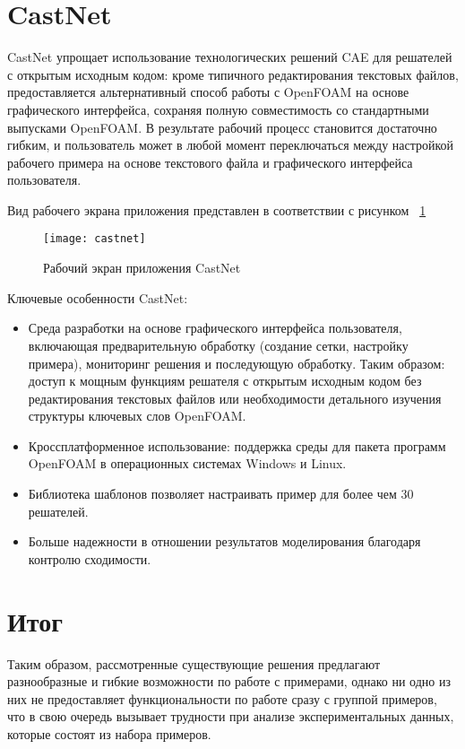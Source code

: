 \documentclass[14pt]{extreport}
\begin{document}
\section{CastNet}

CastNet упрощает использование технологических решений CAE для решателей с открытым исходным кодом: кроме типичного редактирования текстовых файлов, предоставляется альтернативный способ работы с OpenFOAM на основе графического интерфейса, сохраняя полную совместимость со стандартными выпусками OpenFOAM. В результате рабочий процесс становится достаточно гибким, и пользователь может в любой момент переключаться между настройкой рабочего примера на основе текстового файла и графического интерфейса пользователя.

Вид рабочего экрана приложения представлен в соответствии с рисунком ~\ref{fig4}
\begin{figure}[H]
\centerline{\texttt{[image: castnet]}}
\caption{Рабочий экран приложения CastNet}
\label{fig4}
\end{figure}

Ключевые особенности CastNet:
\begin{itemize}
\item Среда разработки на основе графического интерфейса пользователя, включающая предварительную обработку (создание сетки, настройку примера), мониторинг решения и последующую обработку. Таким образом: доступ к мощным функциям решателя с открытым исходным кодом без редактирования текстовых файлов или необходимости детального изучения структуры ключевых слов OpenFOAM.
\item Кроссплатформенное использование: поддержка среды для пакета программ OpenFOAM в операционных системах Windows и Linux.
\item Библиотека шаблонов позволяет настраивать пример для более чем 30 решателей.
\item Больше надежности в отношении результатов моделирования благодаря контролю сходимости.
\end{itemize}

\section{Итог}

Таким образом, рассмотренные существующие решения предлагают разнообразные и гибкие возможности по работе с примерами, однако ни одно из них не предоставляет функциональности по работе сразу с группой примеров, что в свою очередь вызывает трудности при анализе экспериментальных данных, которые состоят из набора примеров.  
\end{document}
